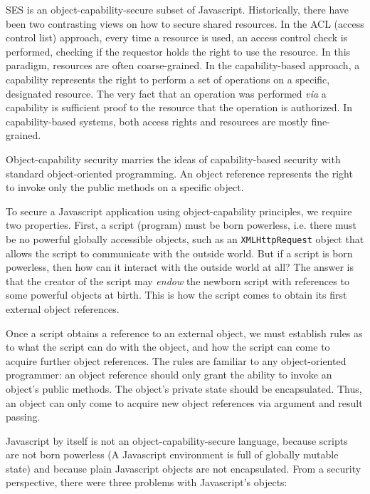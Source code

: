 \documentclass{llncs}
\begin{document}

SES is an object-capability-secure subset of Javascript. Historically, there have been two contrasting views on how to secure shared resources. In the ACL (access control list) approach, every time a resource is used, an access control check is performed, checking if the requestor holds the right to use the resource. In this paradigm, resources are often coarse-grained. In the capability-based approach, a capability represents the right to perform a set of operations on a specific, designated resource. The very fact that an operation was performed \emph{via} a capability is sufficient proof to the resource that the operation is authorized. In capability-based systems, both access rights and resources are mostly fine-grained.

Object-capability security marries the ideas of capability-based security with standard object-oriented programming. An object reference represents the right to invoke only the public methods on a specific object.

To secure a Javascript application using object-capability principles, we require two properties. First, a script (program) must be born powerless, i.e. there must be no powerful globally accessible objects, such as an \texttt{XMLHttpRequest} object that allows the script to communicate with the outside world. But if a script is born powerless, then how can it interact with the outside world at all? The answer is that the creator of the script may \emph{endow} the newborn script with references to some powerful objects at birth. This is how the script comes to obtain its first external object references.

Once a script obtains a reference to an external object, we must establish rules as to what the script can do with the object, and how the script can come to acquire further object references. The rules are familiar to any object-oriented programmer: an object reference should only grant the ability to invoke an object's public methods. The object's private state should be encapsulated. Thus, an object can only come to acquire new object references via argument and result passing.

Javascript by itself is not an object-capability-secure language, because scripts are not born powerless (A Javascript environment is full of globally mutable state) and because plain Javascript objects are not encapsulated. From a security perspective, there were three problems with Javascript's objects:
\end{document}
